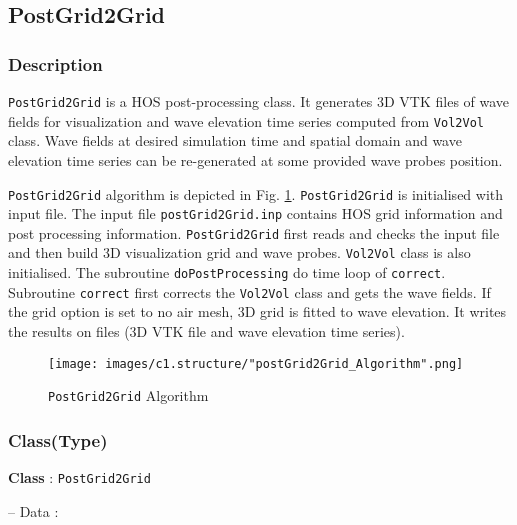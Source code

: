 \pagebreak
	\subsection{PostGrid2Grid}
	
	\label{chap:postGrid2Grid}

	\subsubsection{Description}
	
	\texttt{PostGrid2Grid} is a HOS post-processing class. It generates 3D VTK files of wave fields for visualization and wave elevation time series computed from \texttt{Vol2Vol} class. Wave fields at desired simulation time and spatial domain and wave elevation time series can be re-generated at some provided wave probes position. 

	\texttt{PostGrid2Grid} algorithm is depicted in Fig. \ref{fig:postGrid2GridAlgorighm}. \texttt{PostGrid2Grid} is initialised with input file. The input file \texttt{postGrid2Grid.inp} contains HOS grid information and post processing information. \texttt{PostGrid2Grid} first reads and checks the input file and then build 3D visualization grid and wave probes. \texttt{Vol2Vol} class is also initialised. The subroutine \texttt{doPostProcessing} do time loop of \texttt{correct}. Subroutine \texttt{correct} first corrects the \texttt{Vol2Vol} class and gets the wave fields. If the grid option is set to no air mesh, 3D grid is fitted to wave elevation. It writes the results on files (3D VTK file and wave elevation time series). 
	
	\vspace{0.2cm}
	
	{
		\begin{figure} [H]
			\centering
			\texttt{[image: images/c1.structure/"postGrid2Grid\_Algorithm".png]}
			\vspace{0.5cm}
			\caption{\texttt{PostGrid2Grid} Algorithm}
			\label{fig:postGrid2GridAlgorighm}
		\end{figure}
	}	
	
	\pagebreak
	\subsubsection{Class(Type)}	
	
	\textbf{Class} : \texttt{PostGrid2Grid}
	
	\hspace{0.5 cm} -- Data :
	
